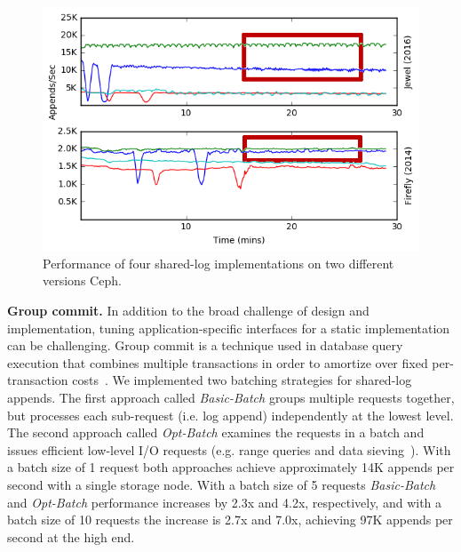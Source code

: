 \begin{figure}
    \centering
    \includegraphics[width=1.0\linewidth]{jewel_v_firefly_pd.png}
    \caption{Performance of four shared-log implementations on two different
    versions Ceph.}
    \label{fig:phy-design}
\end{figure}

{\bf Group commit.} In addition to the broad challenge of design and
implementation, tuning application-specific interfaces for a static
implementation can be challenging.  Group commit is a technique used in
database query execution that combines multiple transactions in order to
amortize over fixed per-transaction costs~\cite{gray}. We implemented two
batching strategies for shared-log appends. The first approach called
\emph{Basic-Batch} groups multiple requests together, but processes each
sub-request (i.e. log append) independently at the lowest level.
The second approach called \emph{Opt-Batch} examines the requests in a batch
and issues efficient low-level I/O requests (e.g. range queries and
data sieving~\cite{750599}). With a batch size of 1 request both approaches achieve
approximately 14K appends per second with a single storage node. With a batch size of 5 requests
\emph{Basic-Batch} and \emph{Opt-Batch} performance increases by 2.3x and 4.2x,
respectively, and with a batch size of 10 requests the increase is 2.7x and 7.0x, achieving
97K appends per second at the high end.

